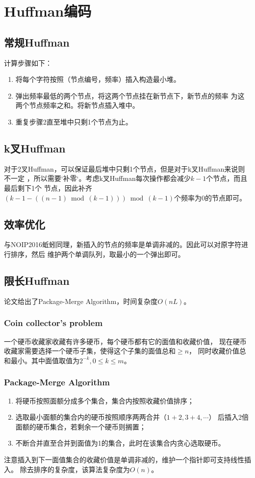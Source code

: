 \section{Huffman编码}
\subsection{常规Huffman}
计算步骤如下：
\begin{enumerate}
	\item 将每个字符按照（节点编号，频率）插入构造最小堆。
	\item 弹出频率最低的两个节点，将这两个节点挂在新节点下，新节点的频率
	      为这两个节点频率之和。将新节点插入堆中。
	\item 重复步骤2直至堆中只剩1个节点为止。
\end{enumerate}
\subsection{k叉Huffman}
对于2叉Huffman，可以保证最后堆中只剩1个节点，但是对于k叉Huffman来说则不一定
，所以需要`补零‘。考虑k叉Huffman每次操作都会减少$k-1$个节点，而且最后剩下1个
节点，因此补齐$(k-1 - ((n-1) \bmod (k-1))) \bmod (k-1)$个频率为0的节点即可。
\subsection{效率优化}
与NOIP2016蚯蚓同理，新插入的节点的频率是单调非减的。因此可以对原字符进行排序，然后
维护两个单调队列，取最小的一个弹出即可。
\subsection{限长Huffman}
论文\cite{LLH}给出了Package-Merge Algorithm，时间复杂度$O(nL)$。
\subsubsection{Coin collector's problem}
一个硬币收藏家收藏有许多硬币，每个硬币都有它的面值和收藏价值，
现在硬币收藏家需要选择一个硬币子集，使得这个子集的面值总和$\geq n$，
同时收藏价值总和最小。其中面值取值为$2^{-k},0\leq k \leq m$。
\subsubsection{Package-Merge Algorithm}
\begin{enumerate}
	\item 将硬币按照面额分成多个集合，集合内按照收藏价值排序；
	\item 选取最小面额的集合内的硬币按照顺序两两合并（$1+2,3+4,\cdots$）
	      后插入2倍面额的硬币集合，若剩余一个硬币则搁置；
	\item 不断合并直至合并到面值为1的集合，此时在该集合内贪心选取硬币。
\end{enumerate}
注意插入到下一面值集合的收藏价值是单调非减的，维护一个指针即可支持线性插入。
除去排序的复杂度，该算法复杂度为$O(n)$。

